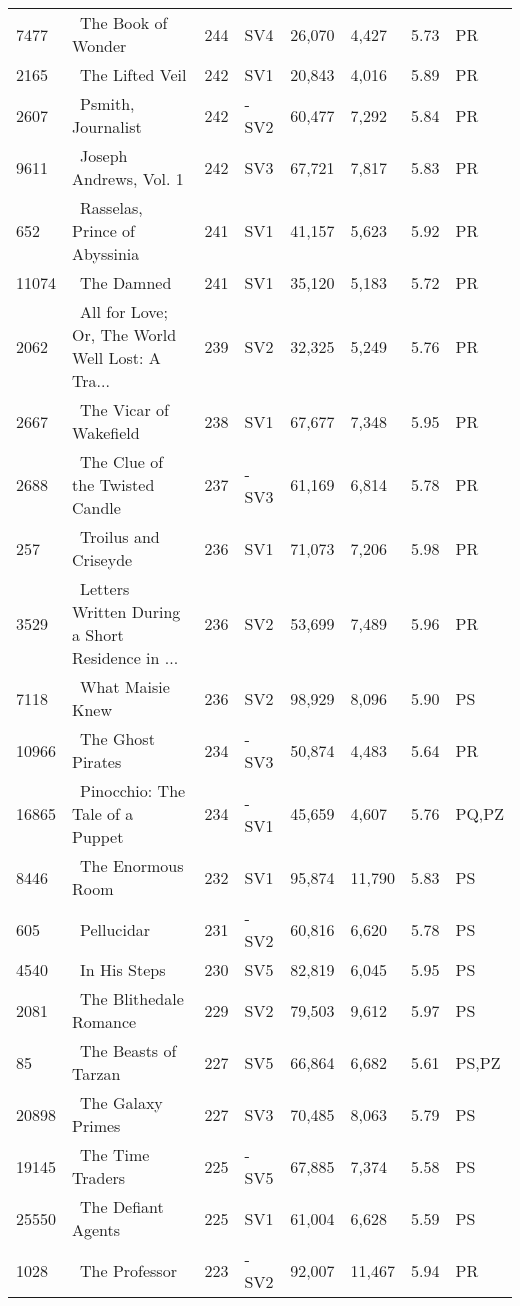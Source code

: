 \begin{longtable}{l | l | l | l | l | l | l | l}
7477 & ~The Book of Wonder & 244 & SV4 & 26,070 & 4,427 & 5.73 & PR\\
2165 & ~The Lifted Veil & 242 & SV1 & 20,843 & 4,016 & 5.89 & PR\\
2607 & ~Psmith, Journalist & 242 & -SV2 & 60,477 & 7,292 & 5.84 & PR\\
9611 & ~Joseph Andrews, Vol. 1 & 242 & SV3 & 67,721 & 7,817 & 5.83 & PR\\
652 & ~Rasselas, Prince of Abyssinia & 241 & SV1 & 41,157 & 5,623 & 5.92 & PR\\
11074 & ~The Damned & 241 & SV1 & 35,120 & 5,183 & 5.72 & PR\\
2062 & ~All for Love; Or, The World Well Lost: A Tra... & 239 & SV2 & 32,325 & 5,249 & 5.76 & PR\\
2667 & ~The Vicar of Wakefield & 238 & SV1 & 67,677 & 7,348 & 5.95 & PR\\
2688 & ~The Clue of the Twisted Candle & 237 & -SV3 & 61,169 & 6,814 & 5.78 & PR\\
257 & ~Troilus and Criseyde & 236 & SV1 & 71,073 & 7,206 & 5.98 & PR\\
3529 & ~Letters Written During a Short Residence in ... & 236 & SV2 & 53,699 & 7,489 & 5.96 & PR\\
7118 & ~What Maisie Knew & 236 & SV2 & 98,929 & 8,096 & 5.90 & PS\\
10966 & ~The Ghost Pirates & 234 & -SV3 & 50,874 & 4,483 & 5.64 & PR\\
16865 & ~Pinocchio: The Tale of a Puppet & 234 & -SV1 & 45,659 & 4,607 & 5.76 & PQ,PZ\\
8446 & ~The Enormous Room & 232 & SV1 & 95,874 & 11,790 & 5.83 & PS\\
605 & ~Pellucidar & 231 & -SV2 & 60,816 & 6,620 & 5.78 & PS\\
4540 & ~In His Steps & 230 & SV5 & 82,819 & 6,045 & 5.95 & PS\\
2081 & ~The Blithedale Romance & 229 & SV2 & 79,503 & 9,612 & 5.97 & PS\\
85 & ~The Beasts of Tarzan & 227 & SV5 & 66,864 & 6,682 & 5.61 & PS,PZ\\
20898 & ~The Galaxy Primes & 227 & SV3 & 70,485 & 8,063 & 5.79 & PS\\
19145 & ~The Time Traders & 225 & -SV5 & 67,885 & 7,374 & 5.58 & PS\\
25550 & ~The Defiant Agents & 225 & SV1 & 61,004 & 6,628 & 5.59 & PS\\
1028 & ~The Professor & 223 & -SV2 & 92,007 & 11,467 & 5.94 & PR\\

\end{longtable}
